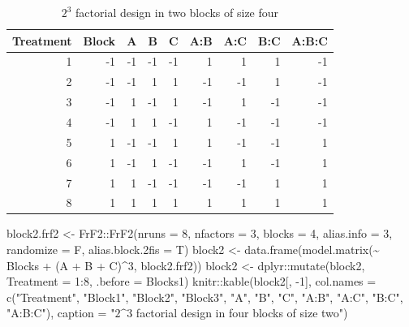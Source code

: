 \documentclass[
]{book}
\newenvironment{Shaded}{\begin{snugshade}}{\end{snugshade}}
\newcommand{\AttributeTok}[1]{\textcolor[rgb]{0.77,0.63,0.00}{#1}}
\newcommand{\DecValTok}[1]{\textcolor[rgb]{0.00,0.00,0.81}{#1}}
\newcommand{\FunctionTok}[1]{\textcolor[rgb]{0.00,0.00,0.00}{#1}}
\newcommand{\NormalTok}[1]{#1}
\newcommand{\OtherTok}[1]{\textcolor[rgb]{0.56,0.35,0.01}{#1}}
\newcommand{\SpecialCharTok}[1]{\textcolor[rgb]{0.00,0.00,0.00}{#1}}
\newcommand{\StringTok}[1]{\textcolor[rgb]{0.31,0.60,0.02}{#1}}
\theoremstyle{definition}
\theoremstyle{definition}
\theoremstyle{definition}
\theoremstyle{definition}
\theoremstyle{remark}
\begin{document}
\begin{table}

\caption{\label{tab:frf2-block-1}$2^3$ factorial design in two blocks of size four}
\centering
\begin{tabular}[t]{r|r|r|r|r|r|r|r|r}
\hline
Treatment & Block & A & B & C & A:B & A:C & B:C & A:B:C\\
\hline
1 & -1 & -1 & -1 & -1 & 1 & 1 & 1 & -1\\
\hline
2 & -1 & -1 & 1 & 1 & -1 & -1 & 1 & -1\\
\hline
3 & -1 & 1 & -1 & 1 & -1 & 1 & -1 & -1\\
\hline
4 & -1 & 1 & 1 & -1 & 1 & -1 & -1 & -1\\
\hline
5 & 1 & -1 & -1 & 1 & 1 & -1 & -1 & 1\\
\hline
6 & 1 & -1 & 1 & -1 & -1 & 1 & -1 & 1\\
\hline
7 & 1 & 1 & -1 & -1 & -1 & -1 & 1 & 1\\
\hline
8 & 1 & 1 & 1 & 1 & 1 & 1 & 1 & 1\\
\hline
\end{tabular}
\end{table}

\begin{Shaded}
\begin{Highlighting}[]
\NormalTok{block2.frf2 }\OtherTok{\textless{}{-}}\NormalTok{ FrF2}\SpecialCharTok{::}\FunctionTok{FrF2}\NormalTok{(}\AttributeTok{nruns =} \DecValTok{8}\NormalTok{, }\AttributeTok{nfactors =} \DecValTok{3}\NormalTok{, }\AttributeTok{blocks =} \DecValTok{4}\NormalTok{, }
                          \AttributeTok{alias.info =} \DecValTok{3}\NormalTok{, }\AttributeTok{randomize =}\NormalTok{ F, }\AttributeTok{alias.block.2fis =}\NormalTok{ T)}
\NormalTok{block2 }\OtherTok{\textless{}{-}} \FunctionTok{data.frame}\NormalTok{(}\FunctionTok{model.matrix}\NormalTok{(}\SpecialCharTok{\textasciitilde{}}\NormalTok{ Blocks }\SpecialCharTok{+}\NormalTok{ (A }\SpecialCharTok{+}\NormalTok{ B }\SpecialCharTok{+}\NormalTok{ C)}\SpecialCharTok{\^{}}\DecValTok{3}\NormalTok{, block2.frf2))}
\NormalTok{block2 }\OtherTok{\textless{}{-}}\NormalTok{ dplyr}\SpecialCharTok{::}\FunctionTok{mutate}\NormalTok{(block2, }\AttributeTok{Treatment =} \DecValTok{1}\SpecialCharTok{:}\DecValTok{8}\NormalTok{, }\AttributeTok{.before =}\NormalTok{ Blocks1)}
\NormalTok{knitr}\SpecialCharTok{::}\FunctionTok{kable}\NormalTok{(block2[, }\SpecialCharTok{{-}}\DecValTok{1}\NormalTok{], }
             \AttributeTok{col.names =} \FunctionTok{c}\NormalTok{(}\StringTok{"Treatment"}\NormalTok{, }\StringTok{"Block1"}\NormalTok{, }\StringTok{"Block2"}\NormalTok{, }\StringTok{"Block3"}\NormalTok{, }
                           \StringTok{"A"}\NormalTok{, }\StringTok{"B"}\NormalTok{, }\StringTok{"C"}\NormalTok{, }
                           \StringTok{"A:B"}\NormalTok{, }\StringTok{"A:C"}\NormalTok{, }\StringTok{"B:C"}\NormalTok{, }\StringTok{"A:B:C"}\NormalTok{),}
             \AttributeTok{caption =} \StringTok{"$2\^{}3$ factorial design in four blocks of size two"}\NormalTok{)}
\end{Highlighting}
\end{Shaded}
\end{document}

